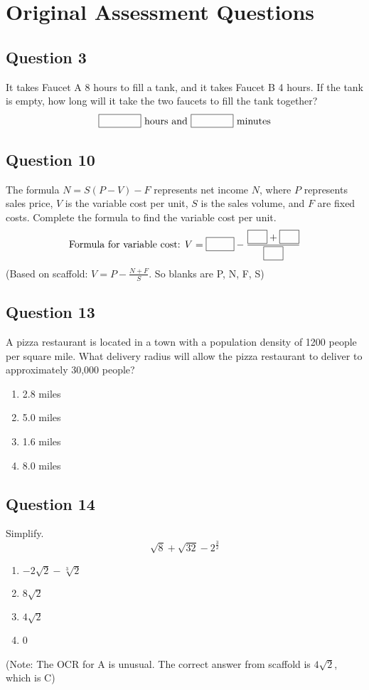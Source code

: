 \documentclass[12pt]{article}
\begin{document}
\section*{Original Assessment Questions}

\subsection*{Question 3}
It takes Faucet A 8 hours to fill a tank, and it takes Faucet B 4 hours. If the tank is empty, how long will it take the two faucets to fill the tank together?
\[ \framebox[1.5cm]{\phantom{X}} \text{ hours and } \framebox[1.5cm]{\phantom{X}} \text{ minutes} \]

\subsection*{Question 10}
The formula \( N = S(P - V) - F \) represents net income \(N\), where \(P\) represents sales price, \(V\) is the variable cost per unit, \(S\) is the sales volume, and \(F\) are fixed costs. Complete the formula to find the variable cost per unit.
\[ \text{Formula for variable cost: } V = \framebox[1cm]{\phantom{X}} - \frac{\framebox[0.7cm]{\phantom{X}} + \framebox[0.7cm]{\phantom{X}}}{\framebox[0.7cm]{\phantom{X}}} \]
(Based on scaffold: \(V = P - \frac{N+F}{S}\). So blanks are P, N, F, S)

\subsection*{Question 13}
A pizza restaurant is located in a town with a population density of 1200 people per square mile. What delivery radius will allow the pizza restaurant to deliver to approximately 30,000 people?
\begin{enumerate}[label=\Alph*.]
    \item 2.8 miles
    \item 5.0 miles
    \item 1.6 miles
    \item 8.0 miles
\end{enumerate}

\subsection*{Question 14}
Simplify.
\[ \sqrt{8} + \sqrt{32} - 2^{\frac{3}{2}} \]
\begin{enumerate}[label=\Alph*.]
    \item \( -2\sqrt{2} - \sqrt[3]{2} \) %
    \item \( 8\sqrt{2} \)
    \item \( 4\sqrt{2} \)
    \item 0
\end{enumerate}
(Note: The OCR for A is unusual. The correct answer from scaffold is \(4\sqrt{2}\), which is C)
\end{document}

